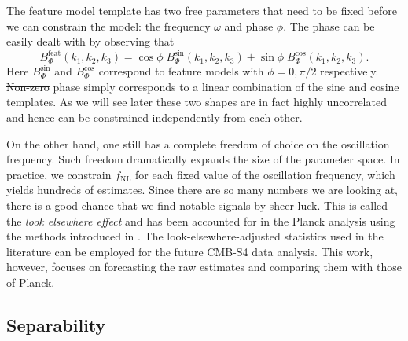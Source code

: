 \documentclass[a4paper,12pt,times,custombib,print,index]{Classes/PhDThesisPSnPDF} %
\providecommand{\DIFadd}[1]{{\protect\color{blue}\uwave{#1}}} %
\providecommand{\DIFdel}[1]{{\protect\color{red}\sout{#1}}}                      %
\providecommand{\DIFaddbegin}{} %
\providecommand{\DIFaddend}{} %
\providecommand{\DIFdelbegin}{} %
\providecommand{\DIFdelend}{} %
\newcommand{\DIFscaledelfig}{0.5}
\newlength{\DIFdelgraphicswidth} %
\newlength{\DIFdelgraphicsheight} %
\newcommand{\DIFaddincludegraphics}[2][]{{\color{blue}\fbox{\DIFOincludegraphics[#1]{#2}}}} %
\newcommand{\DIFdelincludegraphics}[2][]{%
\sbox{\DIFdelgraphicsbox}{\DIFOincludegraphics[#1]{#2}}%
\settoboxwidth{\DIFdelgraphicswidth}{\DIFdelgraphicsbox} %
\settoboxtotalheight{\DIFdelgraphicsheight}{\DIFdelgraphicsbox} %
\scalebox{\DIFscaledelfig}{%
\parbox[b]{\DIFdelgraphicswidth}{\usebox{\DIFdelgraphicsbox}\\[-\baselineskip] \rule{\DIFdelgraphicswidth}{0em}}\llap{\resizebox{\DIFdelgraphicswidth}{\DIFdelgraphicsheight}{%
\setlength{\unitlength}{\DIFdelgraphicswidth}%
\begin{picture}(1,1)%
\thicklines\linethickness{2pt} %
{\color[rgb]{1,0,0}\put(0,0){\framebox(1,1){}}}%
{\color[rgb]{1,0,0}\put(0,0){\line( 1,1){1}}}%
{\color[rgb]{1,0,0}\put(0,1){\line(1,-1){1}}}%
\end{picture}%
}\hspace*{3pt}}} %
} %
\DeclareRobustCommand{\DIFaddbegin}{\DIFOaddbegin \let\includegraphics\DIFaddincludegraphics} %
\DeclareRobustCommand{\DIFaddend}{\DIFOaddend \let\includegraphics\DIFOincludegraphics} %
\DeclareRobustCommand{\DIFdelbegin}{\DIFOdelbegin \let\includegraphics\DIFdelincludegraphics} %
\DeclareRobustCommand{\DIFdelend}{\DIFOaddend \let\includegraphics\DIFOincludegraphics} %
\begin{document}
The feature model template has two free parameters that need to be fixed before we can constrain the model: the frequency $\omega$ and phase $\phi$. The phase can be easily dealt with by observing that
\begin{equation}
	B_\Phi^\text{feat}(k_1, k_2, k_3) = \cos\phi \; B_\Phi^\text{sin} (k_1, k_2, k_3) + \sin\phi \; B_\Phi^\text{cos} (k_1, k_2, k_3).
	\label{feature model bispectrum as a sum of sin and cos}
\end{equation}
Here $B_\Phi^\text{sin}$ and $B_\Phi^\text{cos}$ correspond to feature models with $\phi = 0, \pi/2$ respectively. \DIFdelbegin \DIFdel{Non-zero }\DIFdelend \DIFaddbegin \DIFadd{A template with some non-zero }\DIFaddend phase simply corresponds to a linear combination of the sine and cosine templates. As we will see later these two shapes are in fact highly uncorrelated and hence can be constrained independently from each other.

On the other hand, one still has a complete freedom of choice on the oscillation frequency. Such freedom dramatically expands the size of the parameter space. In practice, we constrain $f_\text{NL}$ for each fixed value of the oscillation frequency, which yields hundreds of estimates. Since there are so many numbers we are looking at, there is a good chance that we find notable signals by sheer luck. This is called the \textit{look elsewhere effect} and has been accounted for in the Planck analysis \cite{PlanckCollaboration2015,PlanckCollaboration2018} using the methods introduced in \cite{Fergusson2015a,Fergusson2015b}. The look-elsewhere-adjusted statistics used in the literature can be employed for the future CMB-S4 data analysis. This work, however, focuses on forecasting the raw estimates and comparing them with those of Planck.


\subsection{Separability}
\end{document}
